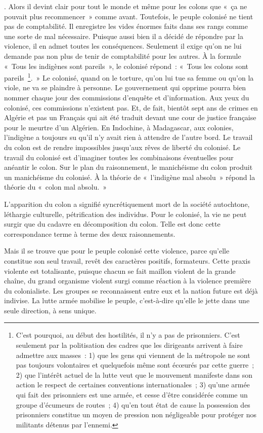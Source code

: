 \documentclass[french,twoside]{book} %
\begin{document}
{}. Alors il devint clair pour tout le   monde et même pour les colons que « ça ne pouvait plus recommencer » comme avant. Toutefois, le peuple colonisé ne tient pas de comptabilité. Il enregistre les vides énormes faits dans ses rangs comme une sorte de mal nécessaire. Puisque aussi bien il a décidé de répondre par la violence, il en admet toutes les conséquences. Seulement il exige qu’on ne lui demande pas non plus de tenir de comptabilité pour les autres. À la formule   « Tous les indigènes sont pareils », le colonisé répond : « Tous les colons sont pareils \footnote{C’est pourquoi, au début des hostilités, il n’y a pas de prisonniers. C’est seulement par la politisation des cadres que les dirigeants arrivent à faire admettre aux masses : 1) que les gens qui viennent de la métropole ne sont pas toujours volontaires et quelquefois même sont écœurés par cette guerre ; 2) que l’intérêt actuel de la lutte veut que le mouvement manifeste dans son action le respect de certaines conventions internationales ; 3) qu’une armée qui fait des prisonniers est une armée, et cesse d’être considérée comme un groupe d’écumeurs de routes ; 4) qu’en tout état de cause la possession des prisonniers constitue un moyen de pression non négligeable pour protéger nos militants détenus par l’ennemi.}. » Le colonisé, quand on le torture, qu’on lui tue sa femme ou qu’on la viole, ne va se plaindre à personne. Le gouvernement qui opprime pourra bien nommer chaque jour des commissions d’enquête et d’information. Aux yeux du colonisé, ces commissions n’existent pas. Et, de fait, bientôt sept ans de crimes en Algérie et pas un Français qui ait été traduit devant une cour de justice française pour le meurtre d’un Algérien. En Indochine, à Madagascar, aux colonies, l’indigène a toujours su qu’il n’y avait rien à attendre de l’autre bord. Le travail du colon est de rendre impossibles jusqu’aux rêves de liberté du colonisé. Le travail du colonisé est d’imaginer toutes les combinaisons éventuelles pour anéantir le colon. Sur le plan du raisonnement, le manichéisme du colon produit un manichéisme du colonisé. À la théorie de « l’indigène mal absolu » répond la théorie du « colon mal absolu. »\par
L’apparition du colon a signifié syncrétiquement mort de la société autochtone, léthargie culturelle, pétrification des individus. Pour le colonisé, la vie ne peut surgir que du cadavre en décomposition du colon. Telle est donc cette correspondance terme à terme des deux raisonnements.\par
Mais il se trouve que pour le peuple colonisé cette violence, parce qu’elle constitue son seul travail, revêt des caractères positifs,   formateurs. Cette praxis violente est totalisante, puisque chacun se fait maillon violent de la grande chaîne, du grand organisme violent surgi comme réaction à la violence première du colonialiste. Les groupes se reconnaissent entre eux et la nation future est déjà indivise. La lutte armée mobilise le peuple, c’est-à-dire qu’elle le jette dans une seule direction, à sens unique.\par
\end{document}
